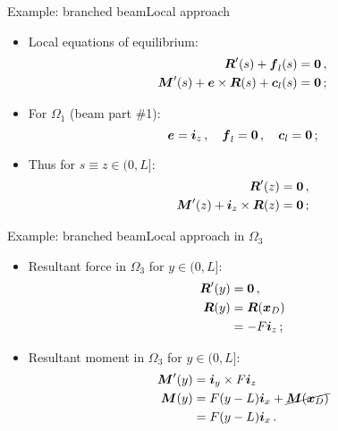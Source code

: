 \documentclass{beamer}
\newcommand{\cj}{c}
\newcommand{\cv}{{\boldsymbol\cj}}
\newcommand{\xj}{x}
\newcommand{\yj}{y}
\newcommand{\zj}{z}
\newcommand{\xv}{{\boldsymbol\xj}}
\newcommand{\ej}{e}
\renewcommand{\ij}{i}
\newcommand{\ev}{{\boldsymbol\ej}}
\newcommand{\iv}{{\boldsymbol\ij}}
\newcommand{\medium}{\Omega}
\newcommand{\fj}{f}
\newcommand{\fv}{{\boldsymbol\fj}}
\newcommand{\Fresj}{R}
\newcommand{\Mresj}{M}
\newcommand{\Fres}{{\boldsymbol\Fresj}}
\newcommand{\Mres}{{\boldsymbol\Mresj}}
\newcommand{\bzero}{{\bf 0}}
\begin{document}
\begin{frame}{Example: branched beam}{Local approach}
\begin{overprint}
\begin{itemize}
\item Local equations of equilibrium:
\begin{displaymath}
\begin{split}
\Fres'(s)+\fv_l(s) &=\bzero\,, \\
\Mres'(s)+\ev\times\Fres(s)+\cv_l(s) &=\bzero\,;
\end{split}
\end{displaymath}
\item For $\medium_1$ (beam part \#1):
\begin{displaymath} 
\ev=\iv_\zj\,,\quad\fv_l=\bzero\,,\quad\cv_l=\bzero\,;
\end{displaymath}
\item Thus for $s\equiv\zj\in(0,L]$:
\begin{displaymath}
\begin{split}
\Fres'(\zj) &=\bzero\,, \\
\Mres'(\zj)+\iv_\zj\times\Fres(\zj) &=\bzero\,;
\end{split}
\end{displaymath}
\end{itemize}

\end{overprint}

\end{frame}

\begin{frame}{Example: branched beam}{Local approach in $\medium_3$}

\begin{itemize}
\item Resultant force in $\medium_3$ for $\yj\in(0,L]$:
\begin{displaymath}
\begin{split}
\Fres'(\yj) &=\bzero\,, \\
\Fres(\yj) &=\Fres(\xv_D) \\
&=-F\iv_\zj\,;
\end{split}
\end{displaymath}
\item Resultant moment in $\medium_3$ for $\yj\in(0,L]$:
\begin{displaymath}
\begin{split}
\Mres'(\yj) &=\iv_\yj\times F\iv_\zj \\
\Mres(\yj) &=F(\yj-L)\iv_\xj+\cancel{\Mres(\xv_D)} \\
&=F(\yj-L)\iv_\xj\,.
\end{split}
\end{displaymath}
\end{itemize}

\end{frame}
\end{document}
